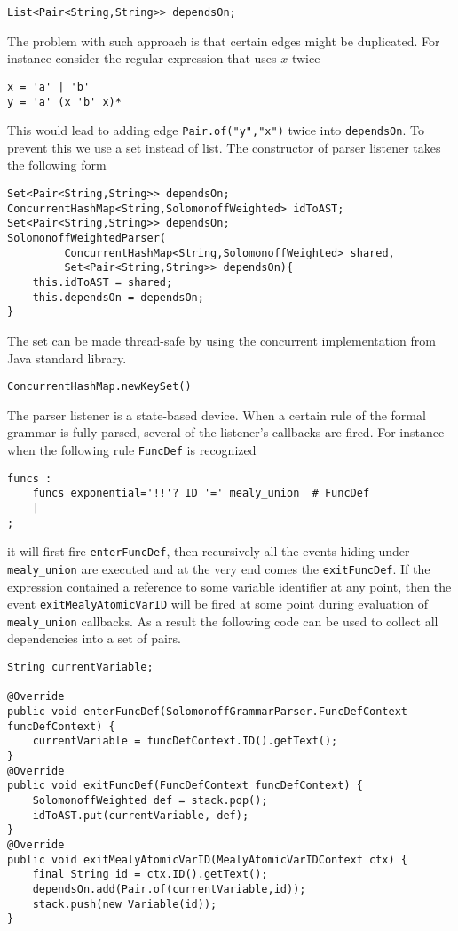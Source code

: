 \begin{lstlisting}
List<Pair<String,String>> dependsOn;
\end{lstlisting}     
The problem with such approach is that certain edges might be duplicated. For instance consider the regular expression that uses $x$ twice
\begin{lstlisting}
x = 'a' | 'b'
y = 'a' (x 'b' x)*
\end{lstlisting}
This would lead to adding edge \texttt{Pair.of("y","x")} twice into \texttt{dependsOn}. To prevent this we use a set instead of list. The constructor of parser listener takes the following form
\begin{lstlisting}
Set<Pair<String,String>> dependsOn;
ConcurrentHashMap<String,SolomonoffWeighted> idToAST;
Set<Pair<String,String>> dependsOn;
SolomonoffWeightedParser(
         ConcurrentHashMap<String,SolomonoffWeighted> shared,
         Set<Pair<String,String>> dependsOn){
    this.idToAST = shared;
    this.dependsOn = dependsOn;
}
\end{lstlisting}
The set can be made thread-safe by using the concurrent implementation from Java standard library.
\begin{lstlisting}
ConcurrentHashMap.newKeySet()
\end{lstlisting}
The parser listener is a state-based device. When a certain rule of the formal grammar is fully parsed, several of the listener's callbacks are fired. For instance when the following rule \texttt{FuncDef} is recognized
\begin{lstlisting}
funcs :
    funcs exponential='!!'? ID '=' mealy_union  # FuncDef
    | 
;
\end{lstlisting} 
it will first fire \texttt{enterFuncDef}, then recursively all the events hiding under \texttt{mealy\_union} are executed and at the very end comes the \texttt{exitFuncDef}. If the expression contained a reference to some variable identifier at any point, then the event \texttt{exitMealyAtomicVarID} will be fired at some point during evaluation of \texttt{mealy\_union} callbacks. As a result the following code can be used to collect all dependencies into a set of pairs.
\begin{lstlisting}
String currentVariable;

@Override
public void enterFuncDef(SolomonoffGrammarParser.FuncDefContext funcDefContext) {
    currentVariable = funcDefContext.ID().getText();
}
@Override
public void exitFuncDef(FuncDefContext funcDefContext) {
    SolomonoffWeighted def = stack.pop();
    idToAST.put(currentVariable, def);
}
@Override
public void exitMealyAtomicVarID(MealyAtomicVarIDContext ctx) {
    final String id = ctx.ID().getText();
    dependsOn.add(Pair.of(currentVariable,id));
    stack.push(new Variable(id));
}
\end{lstlisting}
